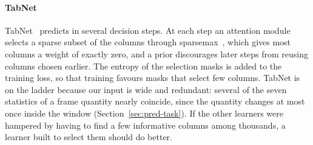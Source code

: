 \paragraph{TabNet}
TabNet~\cite{arik2021tabnet} predicts in several decision steps. At each step an attention module selects
a sparse subset of the columns through sparsemax~\cite{martins2016sparsemax}, which gives most columns a
weight of exactly zero, and a prior discourages later steps from reusing columns chosen earlier. The
entropy of the selection masks is added to the training loss, so that training favours masks that select
few columns. TabNet is on the ladder because our input is wide and redundant: several of the seven
statistics of a frame quantity nearly coincide, since the quantity changes at most once inside the
window (Section~\ref{sec:pred-task}). If the other learners were hampered by having to find a few
informative columns among thousands, a learner built to select them should do better.

